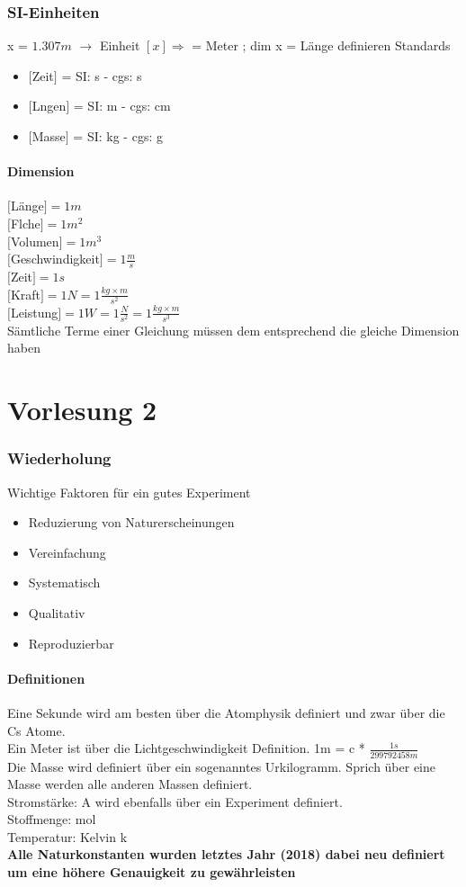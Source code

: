 \documentclass[11pt]{article}
\begin{document}
	\section{SI-Einheiten}
		x = $1.307 m$ $\rightarrow$ Einheit $[x] \Rightarrow$ = Meter ; dim x = Länge definieren Standards
		\begin{itemize}
			\item $[$Zeit$]$ = SI: s - cgs: s
			\item $[$Lngen$]$ = SI: m - cgs: cm
			\item $[$Masse$]$ = SI: kg - cgs: g
		\end{itemize}
		\subsection{Dimension}
	$[$Länge$] = 1m$\\
	$[$Flche$] = 1m^2$\\
	$[$Volumen$] = 1m^3$\\
	$[$Geschwindigkeit$] = 1\frac{m}{s}$\\
	$[$Zeit$] = 1s$\\
	$[$Kraft$] = 1N = 1\frac{kg\times m}{s^2}$\\
	$[$Leistung$] = 1W = 1\frac{N}{s^2} = 1\frac{kg\times m}{s^3}$\\
	Sämtliche Terme einer Gleichung müssen dem entsprechend die gleiche Dimension haben
\part{Vorlesung 2}
	\section{Wiederholung}
	Wichtige Faktoren für ein gutes Experiment
		\begin{itemize}
			\item Reduzierung von Naturerscheinungen
			\item Vereinfachung
			\item Systematisch
			\item Qualitativ
			\item Reproduzierbar
		\end{itemize}
\subsection{Definitionen}
 	Eine Sekunde wird am besten über die Atomphysik definiert und zwar über die Cs Atome.\\
 	Ein Meter ist über die Lichtgeschwindigkeit Definition. 1m = c * $\frac{1s}{299792458 m}$\\
 	Die Masse wird definiert über ein sogenanntes Urkilogramm. Sprich über eine Masse werden alle anderen Massen definiert.\\
 	Stromstärke: A wird ebenfalls über ein Experiment definiert.\\
 	Stoffmenge: mol\\
 	Temperatur: Kelvin \quad k\\
 	\textbf{Alle Naturkonstanten wurden letztes Jahr (2018) dabei neu definiert um eine höhere Genauigkeit zu gewährleisten}
\end{document}
